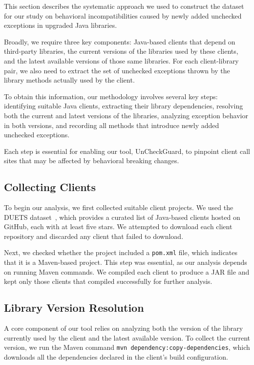 This section describes the systematic approach we used to construct the dataset for our study on behavioral incompatibilities caused by newly added unchecked exceptions in upgraded Java libraries. 

Broadly, we require three key components: Java-based clients that depend on third-party libraries, the current versions of the libraries used by these clients, and the latest available versions of those same libraries. For each client-library pair, we also need to extract the set of unchecked exceptions thrown by the library methods actually used by the client.

To obtain this information, our methodology involves several key steps: identifying suitable Java clients, extracting their library dependencies, resolving both the current and latest versions of the libraries, analyzing exception behavior in both versions, and recording all methods that introduce newly added unchecked exceptions. 

Each step is essential for enabling our tool, UnCheckGuard, to pinpoint client call sites that may be affected by behavioral breaking changes.

\subsection{Collecting Clients}

To begin our analysis, we first collected suitable client projects. We used the DUETS dataset~\cite{durieux21:_duets}, which provides a curated list of Java-based clients hosted on GitHub, each with at least five stars. We attempted to download each client repository and discarded any client that failed to download.

Next, we checked whether the project included a \texttt{pom.xml} file, which indicates that it is a Maven-based project. This step was essential, as our analysis depends on running Maven commands. We compiled each client to produce a JAR file and kept only those clients that compiled successfully for further analysis.

\subsection{Library Version Resolution}

A core component of our tool relies on analyzing both the version of the library currently used by the client and the latest available version. To collect the current version, we run the Maven command \texttt{mvn dependency:copy-dependencies}, which downloads all the dependencies declared in the client's build configuration.

